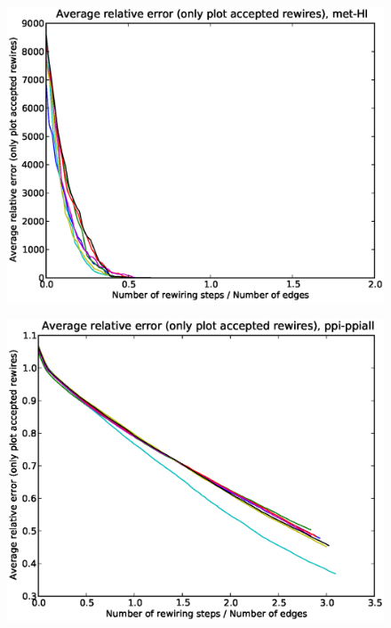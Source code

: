 \documentclass[12pt]{article}
\begin{document}
\begin{figure}[p]
\includegraphics[scale=0.75]{acceptedOnly-met-HI.eps}\\
\end{figure}


\begin{figure}[p]
\includegraphics[scale=0.75]{acceptedOnly-ppi-ppiall.eps}\\
\end{figure}
\end{document}
